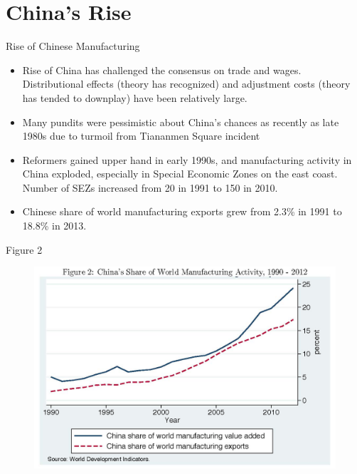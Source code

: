 \documentclass[aspectratio=169]{beamer}
\begin{document}

\section{China's Rise}


\begin{frame}{Rise of Chinese Manufacturing}

\begin{itemize}
    \item<1-> Rise of China has challenged the consensus on trade and wages.  Distributional effects (theory has recognized) and adjustment costs (theory has tended to downplay) have been relatively large.
    \item<2->  Many pundits were pessimistic about China’s chances as recently as late 1980s due to turmoil from Tiananmen Square incident
    \item<3-> Reformers gained upper hand in early 1990s, and manufacturing activity in China exploded, especially in Special Economic Zones on the east coast.  Number of SEZs increased from 20 in 1991 to 150 in 2010.
    \item<4-> Chinese share of world manufacturing exports grew from 2.3\% in 1991 to 18.8\% in 2013.  
\end{itemize}
    
\end{frame}


\begin{frame}{Figure 2}

\begin{figure}
    \centering
    \includegraphics[scale=0.7]{AutorDornHansonFig2.jpg}
    \label{fig:fig2}
\end{figure}
    
\end{frame}
\end{document}
